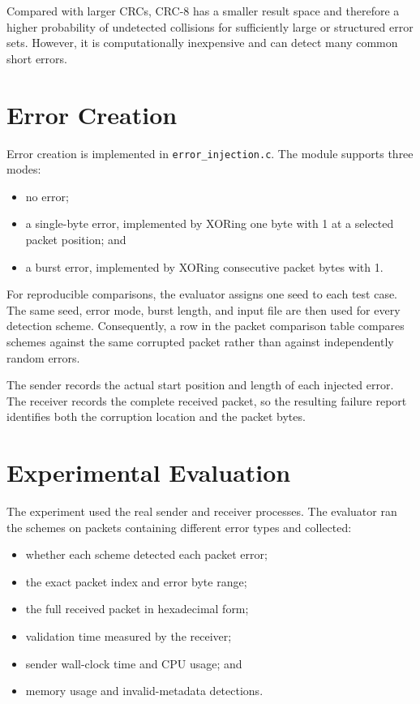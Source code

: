 \documentclass[12pt,a4paper]{article}
\begin{document}
Compared with larger CRCs, CRC-8 has a smaller result space and therefore a
higher probability of undetected collisions for sufficiently large or
structured error sets. However, it is computationally inexpensive and can
detect many common short errors.

\section{Error Creation}

Error creation is implemented in \texttt{error\_injection.c}. The module
supports three modes:

\begin{itemize}
  \item no error;
  \item a single-byte error, implemented by XORing one byte with 1 at a
        selected packet position; and
  \item a burst error, implemented by XORing consecutive packet bytes with 1.
\end{itemize}

For reproducible comparisons, the evaluator assigns one seed to each test
case. The same seed, error mode, burst length, and input file are then used
for every detection scheme. Consequently, a row in the packet comparison
table compares schemes against the same corrupted packet rather than against
independently random errors.

The sender records the actual start position and length of each injected
error. The receiver records the complete received packet, so the resulting
failure report identifies both the corruption location and the packet bytes.

\section{Experimental Evaluation}

The experiment used the real sender and receiver processes. The evaluator
ran the schemes on packets containing different error types and collected:

\begin{itemize}
  \item whether each scheme detected each packet error;
  \item the exact packet index and error byte range;
  \item the full received packet in hexadecimal form;
  \item validation time measured by the receiver;
  \item sender wall-clock time and CPU usage; and
  \item memory usage and invalid-metadata detections.
\end{itemize}
\end{document}
